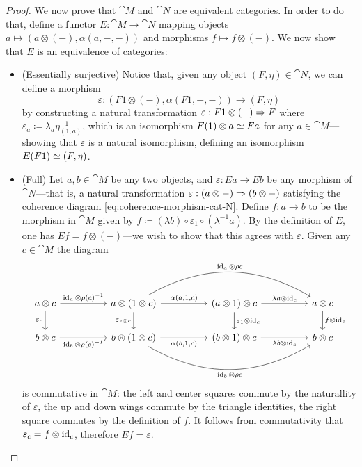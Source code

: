 \documentclass[../../deep-dive]{subfiles}
\begin{document}
\begin{proof}
We now prove that \(\cat M\) and \(\cat N\) are equivalent categories. In order
to do that, define a functor \(E: \cat M \to \cat N\) mapping objects
\(a \mapsto (a \otimes (-), \alpha(a, -, -))\) and morphisms
\(f \mapsto f \otimes (-)\). We now show that \(E\) is an equivalence of
categories:
\begin{itemize}\setlength\itemsep{0em}
\item (Essentially surjective) Notice that, given any object
  \((F, \eta) \in \cat N\), we can define a morphism
  \[
  \varepsilon: (F 1 \otimes (-), \alpha(F1, -, -))
  \longrightarrow (F, \eta)
  \]
  by constructing a natural transformation
  \(\varepsilon: F 1 \otimes (-) \Rightarrow F\) where
  \(\varepsilon_a \coloneq \lambda_{a} \eta_{(1, a)}^{-1}\), which is an
  isomorphism \(F(1) \otimes a \simeq F a\) for any \(a \in \cat M\)---showing
  that \(\varepsilon\) is a natural isomorphism, defining an isomorphism
  \(E(F 1) \simeq (F, \eta)\).

\item (Full) Let \(a, b \in \cat M\) be any two objects, and
  \(\varepsilon: E a \to E b\) be any morphism of \(\cat N\)---that is, a
  natural transformation \(\varepsilon: (a \otimes -) \Rightarrow (b \otimes -)\)
  satisfying the coherence diagram \cref{eq:coherence-morphism-cat-N}. Define
  \(f: a \to b\) to be the morphism in \(\cat M\) given by
  \(f \coloneq (\lambda b) \circ \varepsilon_1 \circ (\lambda^{-1} a)\). By the
  definition of \(E\), one has \(E f = f \otimes (-)\)---we wish to show that
  this agrees with \(\varepsilon\). Given any \(c \in \cat M\) the diagram
  \[
  \begin{tikzcd}
  a \otimes c \ar[rr, "{\Id_a \otimes \rho(c)^{-1}}"]
  \ar[d, "\varepsilon_c"']
  && a \otimes (1  \otimes c) \ar[rr, "{\alpha(a, 1, c)}"]
  \ar[d, "\varepsilon_{e \otimes c}"']
  \ar[rrrr, bend left=30, "{\Id_a \otimes \rho c}"]
  && (a \otimes 1) \otimes c \ar[rr, "{\lambda a \otimes \Id_c}"]
  \ar[d, "\varepsilon_1 \otimes \Id_c"]
  && a \otimes c \ar[d, "f \otimes \Id_c"]
  \\
  b \otimes c \ar[rr, "{\Id_b \otimes \rho(c)^{-1}}"']
  && b \otimes (1 \otimes c) \ar[rr, "{\alpha(b, 1, c)}"']
  \ar[rrrr, bend right=30, "{\Id_b \otimes \rho c}"']
  && (b \otimes 1) \otimes c \ar[rr, "{\lambda b \otimes \Id_c}"']
  && b \otimes c
  \end{tikzcd}
  \]
  is commutative in \(\cat M\): the left and center squares commute by the
  naturallity of \(\varepsilon\), the up and down wings commute by the triangle
  identities, the right square commutes by the definition of \(f\). It follows
  from commutativity that \(\varepsilon_c = f \otimes \operatorname{id}_c\), therefore
  \(E f = \varepsilon\).


\end{itemize}
\end{proof}
\end{document}
